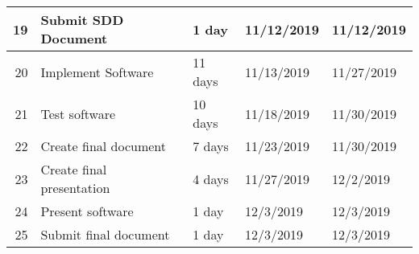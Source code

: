 \begin{tabular}{| r | p{5cm} | l | l | l |}
    19 & Submit SDD Document & 1 day & 11/12/2019 & 11/12/2019 \\ \hline
    20 & Implement Software & 11 days & 11/13/2019 & 11/27/2019 \\ \hline
    21 & Test software & 10 days & 11/18/2019 & 11/30/2019 \\ \hline
    22 & Create final document & 7 days & 11/23/2019 & 11/30/2019 \\ \hline
    23 & Create final presentation & 4 days & 11/27/2019 & 12/2/2019 \\ \hline
    24 & Present software & 1 day & 12/3/2019 & 12/3/2019 \\ \hline
    25 & Submit final document & 1 day & 12/3/2019 & 12/3/2019 \\ \hline
\end{tabular}